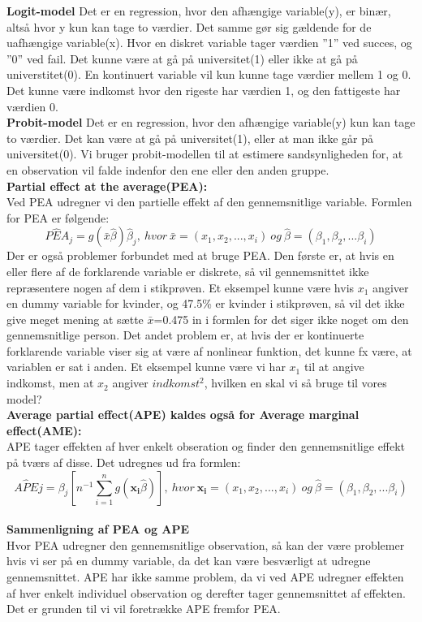 \documentclass[
  10pt,
]{article}
\begin{document}
\textbf{Logit-model} Det er en regression, hvor den afhængige
variable(y), er binær, altså hvor y kun kan tage to værdier. Det samme
gør sig gældende for de uafhængige variable(x). Hvor en diskret variable
tager værdien ''1'' ved succes, og ''0'' ved fail. Det kunne være at gå
på universitet(1) eller ikke at gå på universtitet(0). En kontinuert
variable vil kun kunne tage værdier mellem 1 og 0. Det kunne være
indkomst hvor den rigeste har værdien 1, og den fattigeste har værdien
0.\\
\newline \textbf{Probit-model} Det er en regression, hvor den afhængige
variable(y) kun kan tage to værdier. Det kan være at gå på
universitet(1), eller at man ikke går på universitet(0). Vi bruger
probit-modellen til at estimere sandsynligheden for, at en observation
vil falde indenfor den ene eller den anden gruppe.\\
\newline \textbf{Partial effect at the average(PEA):}\\
Ved PEA udregner vi den partielle effekt af den gennemsnitlige variable.
Formlen for PEA er følgende:
\[ P\hat{E}A_j=g(\bar{x}\hat{\beta})\hat{\beta}_j, \ hvor\ \bar{x}=(x_1,x_2,...,x_i)\ og\ \hat{\beta}=(\beta_1,\beta_2,...\beta_i)\]
Der er også problemer forbundet med at bruge PEA. Den første er, at hvis
en eller flere af de forklarende variable er diskrete, så vil
gennemsnittet ikke repræsentere nogen af dem i stikprøven. Et eksempel
kunne være hvis \(x_1\) angiver en dummy variable for kvinder, og 47.5\%
er kvinder i stikprøven, så vil det ikke give meget mening at sætte
\(\bar{x}\)=0.475 in i formlen for det siger ikke noget om den
gennemsnitlige person. Det andet problem er, at hvis der er kontinuerte
forklarende variable viser sig at være af nonlinear funktion, det kunne
fx være, at variablen er sat i anden. Et eksempel kunne være vi har
\(x_1\) til at angive indkomst, men at \(x_2\) angiver \(indkomst^2\),
hvilken en skal vi så bruge til vores model?\\
\newline
\textbf{Average partial effect(APE) kaldes også for Average marginal effect(AME):}\\
APE tager effekten af hver enkelt obseration og finder den
gennemsnitlige effekt på tværs af disse. Det udregnes ud fra formlen:
\[A\hat{P}Ej=\hat{\beta_j}\left[n^{-1}\sum\limits_{i=1}^ng(\mathbf{x_i}\hat{\beta})\right],\ hvor\ \mathbf{x_i}=(x_1,x_2,...,x_i)\ og\ \hat{\beta}=(\beta_1,\beta_2,...\beta_i) \]\\
\textbf{Sammenligning af PEA og APE}\\
Hvor PEA udregner den gennemsnitlige observation, så kan der være
problemer hvis vi ser på en dummy variable, da det kan være besværligt
at udregne gennemsnittet. APE har ikke samme problem, da vi ved APE
udregner effekten af hver enkelt individuel observation og derefter
tager gennemsnittet af effekten. Det er grunden til vi vil foretrække
APE fremfor PEA.
\end{document}
